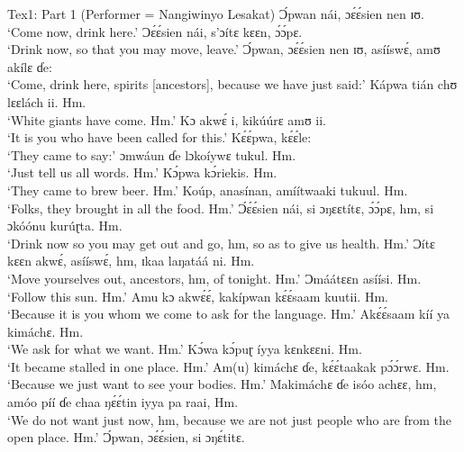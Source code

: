 \documentclass[output=paper,colorlinks,citecolor=brown]{langscibook}
\begin{document}
\ea Tex1: Part 1 (Performer = Nangiwinyo Lesakat)\largerpage
    \ea    Ɔ́pwan nái, ɔɛ́ɛ́sien nen ɪʊ.\\
            `Come now, drink here.'
    \ex     Ɔɛ́ɛ́sien nái, s’ɔítɛ kɛɛn, ɔ́ɔ́pɛ. \\
            `Drink now, so that you may move, leave.'
    \ex     Ɔ́pwan, ɔɛ́ɛ́sien nen ɪʊ, asííswɛ́, amʊ akílɛ ɗe:\\
            `Come, drink here, spirits [ancestors], because we have just said:'
    \ex     Kápwa tián chʊ lɛɛlách ii. Hm.\\
            `White giants have come. Hm.' 
    \ex     Kɔ akwɛ́ i, kikúúrɛ amʊ ii. \\
            `It is you who have been called for this.'
    \ex     Kɛ́ɛ́pwa, kɛ́ɛ́le:\\
            `They came to say:'
    \ex     ɔmwáun ɗe lɔkoíywɛ tukul. Hm. \\
            `Just tell us all words. Hm.'
    \ex     Kɔ́pwa kɔ́riekis. Hm.\\
            `They came to brew beer. Hm.'
    \ex     Koúp, anasínan, amíítwaaki tukuul. Hm. \\
            `Folks, they brought in all the food. Hm.'
    \ex     Ɔ́ɛ́ɛ́sien nái, si ɔŋɛɛtítɛ, ɔ́ɔ́pɛ, hm, si ɔkóónu kurúɽta. Hm.\\
            `Drink now so you may get out and go, hm, so as to give us health. Hm.'
    \ex     Ɔítɛ kɛɛn akwɛ́, asííswɛ́, hm, ɪkaa laŋatáá ni. Hm. \\
            `Move yourselves out, ancestors, hm, of tonight. Hm.'
    \ex     Ɔmáátɛɛn asíísi. Hm.\\
            `Follow this sun. Hm.'
    \ex     Amu kɔ akwɛ́ɛ́, kakípwan kɛ́ɛ́saam kuutii. Hm.\\
            `Because it is you whom we come to ask for the language. Hm.'
    \ex     Akɛ́ɛ́saam kíí ya kimáchɛ. Hm.\\
            `We ask for what we want. Hm.'
    \ex     Kɔ́wa kɔ́puɽ íyya kɛnkɛɛni. Hm.\\
            `It became stalled in one place. Hm.'
    \ex     Am(u) kimáchɛ ɗe, kɛ́ɛ́taakak pɔ́ɔ́rwɛ. Hm.\\
            `Because we just want to see your bodies. Hm.'
    \ex     Makimáchɛ ɗe isóo achɛɛ, hm, amóo píí ɗe chaa ŋɛ́ɛ́tin iyya pa raai, Hm.\\
            `We do not want just now, hm, because we are not just people who are from the open place. Hm.'
    \ex     Ɔ́pwan, ɔɛ́ɛ́sien, si ɔŋɛ́titɛ.\\
\end{document}
